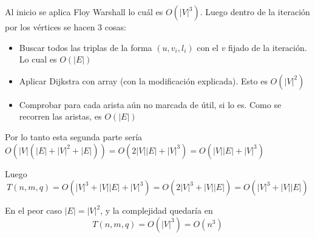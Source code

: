 \documentclass[a4paper]{article}
\begin{document}
	Al inicio se aplica Floy Warshall lo cuál es $O(|V|^3)$. Luego dentro de la iteración por los vértices se hacen 3 cosas:
	\begin{itemize}
		\item Buscar todos las triplas de la forma $(u, v_i, l_i)$ con el $v$ fijado de la iteración. Lo cual es $O(|E|)$
		\item Aplicar Dijkstra con array (con la modificación explicada). Esto es $O(|V|^2)$
		\item Comprobar para cada arista aún no marcada de útil, si lo es. Como se recorren las aristas, es $O(|E|)$
	\end{itemize}
	
	Por lo tanto esta segunda parte sería $O(|V|(|E| + |V|^2 + |E|)) = O(2|V||E| + |V|^3) = O(|V||E| + |V|^3)$
	
	Luego $$T(n,m,q) = O(|V|^3 + |V||E| + |V|^3) = O(2|V|^3 + |V||E|) = O(|V|^3 + |V||E|)$$
	
	En el peor caso $|E| = |V|^2$, y la complejidad quedaría en
	$$T(n,m,q) = O(|V|^3) = O(n^3)$$
    
\end{document}

